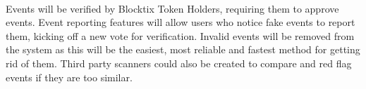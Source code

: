 \documentclass[a4paper]{article}
\begin{document}
\paragraph{} Events will be verified by Blocktix Token Holders, requiring them to approve events. Event reporting features will allow users who notice fake events to report them, kicking off a new vote for verification. Invalid events will be removed from the system as this will be the easiest, most reliable and fastest method for getting rid of them. Third party scanners could also be created to compare and red flag events if they are too similar. 



\end{document}
